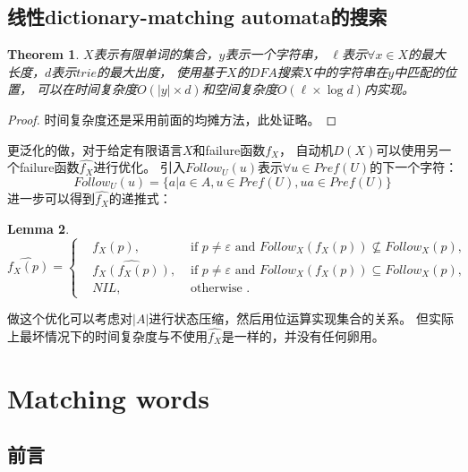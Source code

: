 \documentclass[UTF8]{ctexart}
\newtheorem{thm}{Theorem}[subsection]
\newtheorem{lem}[thm]{Lemma}
\theoremstyle{definition}
\theoremstyle{remark}
\numberwithin{equation}{subsection}
\begin{document}
\subsection{线性dictionary-matching automata的搜索}

	\begin{thm}
		$X$表示有限单词的集合，$y$表示一个字符串，
		$\ell$表示$\forall x \in X$的最大长度，$d$表示$trie$的最大出度，
		使用基于$X$的$DFA$搜索$X$中的字符串在$y$中匹配的位置，
		可以在时间复杂度$O(|y| \times d)$和空间复杂度$O(\ell \times \log d)$内实现。
	\end{thm}
	\begin{proof}
		时间复杂度还是采用前面的均摊方法，此处证略。
	\end{proof}
	
	更泛化的做，对于给定有限语言$X$和failure函数$f_X$，
	自动机$D(X)$可以使用另一个failure函数$\hat{f_X}$进行优化。
	引入$Follow_U(u)$表示$\forall u \in Pref(U)$的下一个字符：
	\[
		Follow_U(u) = \{a | a \in A, u \in Pref(U), ua \in Pref(U) \}
	\]
	进一步可以得到$\hat{f_X}$的递推式：
	\begin{lem}
		\[
			\hat{f_X(p)} =
			\left\{
				\begin{aligned}
					&f_X(p),			&\text{ if } p \neq \varepsilon \text{ and } Follow_X(f_X(p)) \nsubseteq Follow_X(p),   \\
					&\hat{f_X(f_X(p))},	&\text{ if } p \neq \varepsilon \text{ and } Follow_X(f_X(p)) \subseteq Follow_X(p),    \\   
					&NIL,				&\text{ otherwise }.
				\end{aligned}
			\right .
		\]
	\end{lem}
	做这个优化可以考虑对$|A|$进行状态压缩，然后用位运算实现集合的关系。
	但实际上最坏情况下的时间复杂度与不使用$\hat{f_X}$是一样的，并没有任何卵用。
	
\section*{Matching words}
\subsection{前言}	
	
\end{document}
